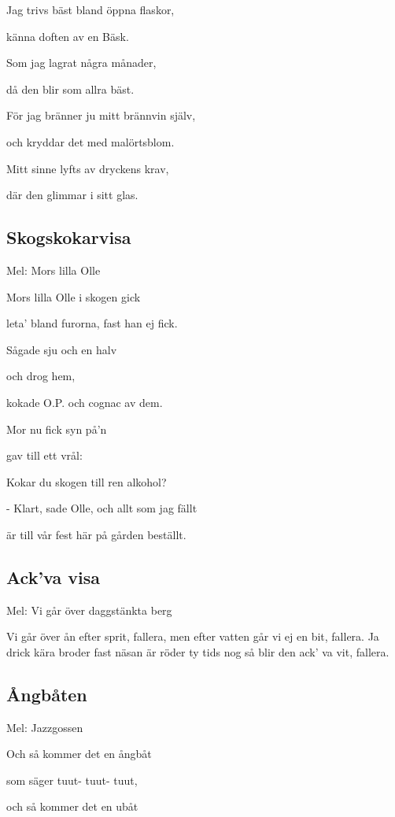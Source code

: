 Jag trivs bäst bland öppna flaskor,

känna doften av en Bäsk.

Som jag lagrat några månader,

då den blir som allra bäst.

För jag bränner ju mitt brännvin själv,

och kryddar det med malörtsblom.

Mitt sinne lyfts av dryckens krav,

där den glimmar i sitt glas.

\subsection{\textbf{Skogskokarvisa}}

Mel: Mors lilla Olle\bigskip

Mors lilla Olle i skogen gick

leta’ bland furorna, fast han ej fick.

Sågade sju och en halv

och drog hem,

kokade O.P. och cognac av dem.

Mor nu fick syn på’n

gav till ett vrål:

Kokar du skogen till ren alkohol?

- Klart, sade Olle, och allt som jag fällt

är till vår fest här på gården beställt.

\subsection{\textbf{Ack’va visa}}

Mel: Vi går över daggstänkta berg\bigskip

Vi går över ån efter sprit, fallera,
men efter vatten går vi ej en bit, fallera.
Ja drick kära broder fast näsan är röder
ty tids nog så blir den ack’ va vit, fallera.

\subsection{\textbf{Ångbåten}}

Mel: Jazzgossen\bigskip


Och så kommer det en ångbåt

som säger tuut- tuut- tuut,

och så kommer det en ubåt

